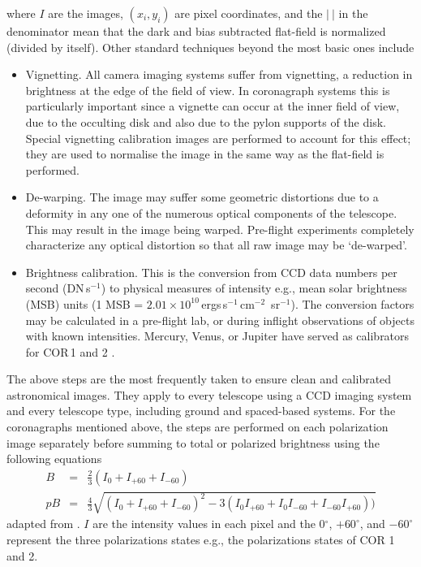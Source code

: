 where $I$ are the images, $(x_i, y_i)$ are pixel coordinates, and the $|~|$ in the denominator mean that the dark and bias subtracted flat-field is normalized (divided by itself). Other standard techniques beyond the most basic ones include
\begin{itemize}
%
%
\item Vignetting. All camera imaging systems suffer from vignetting, a reduction in brightness at the edge of the field of view. In coronagraph systems this is particularly important since a vignette can occur at the inner field of view, due to the occulting disk and also due to the pylon supports of the disk. Special vignetting calibration images are performed to account for this effect; they are used to normalise the image in the same way as the flat-field is performed.
%
%
\item De-warping. The image may suffer some geometric distortions due to a deformity in any one of the numerous optical components of the telescope. This may result in the image being warped. Pre-flight experiments completely characterize any optical distortion so that all raw image may be `de-warped'.
%
%
\item Brightness calibration. This is the conversion from CCD data numbers per second (DN\,s$^{-1}$) to physical measures of intensity e.g., mean solar brightness (MSB) units (1 MSB = $2.01\times10^{10}$\,ergs\,s$^{-1}$\,cm$^{-2}$\, sr$^{-1}$). The conversion factors may be calculated in a pre-flight lab, or during inflight observations of objects with known intensities. Mercury, Venus, or Jupiter have served as calibrators for COR\,1 and 2 \citep{thomp2008}.
\end{itemize}
The above steps are the most frequently taken to ensure clean and calibrated astronomical images. They apply to every telescope using a CCD imaging system and every telescope type, including ground and spaced-based systems. For the coronagraphs mentioned above, the steps are performed on each polarization image separately before summing to total or polarized brightness using the following equations
\begin{eqnarray}
B &=& \frac{2}{3}(I_0 + I_{+60} + I_{-60}) \\
pB &=& \frac{4}{3}\sqrt{(I_0 + I_{+60} + I_{-60})^2 - 3(I_0I_{+60} + I_0I_{-60} + I_{-60}I_{+60}) )}
\end{eqnarray}
adapted from \citet{billings1966}. $I$ are the intensity values in each pixel and the 0$^{\circ}$, $+60^{\circ}$, and $-60^{\circ}$ represent the three polarizations states e.g., the polarizations states of COR 1 and 2.


